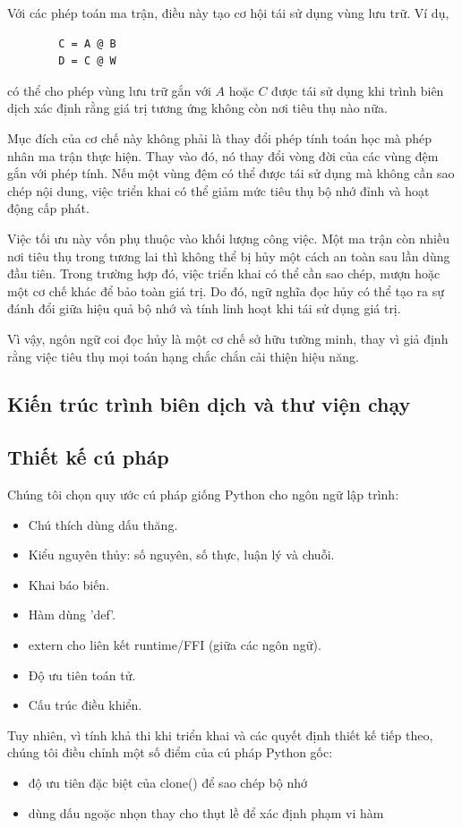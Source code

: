 \documentclass[a4paper]{article}
\begin{document}
	Với các phép toán ma trận, điều này tạo cơ hội tái sử dụng vùng lưu trữ. Ví dụ,
	
	\begin{lstlisting}
		C = A @ B
		D = C @ W
	\end{lstlisting}
	
	có thể cho phép vùng lưu trữ gắn với $A$ hoặc $C$ được tái sử dụng khi trình biên dịch xác định rằng giá trị tương ứng không còn nơi tiêu thụ nào nữa.
	
	Mục đích của cơ chế này không phải là thay đổi phép tính toán học mà phép nhân ma trận thực hiện. Thay vào đó, nó thay đổi vòng đời của các vùng đệm gắn với phép tính. Nếu một vùng đệm có thể được tái sử dụng mà không cần sao chép nội dung, việc triển khai có thể giảm mức tiêu thụ bộ nhớ đỉnh và hoạt động cấp phát.
	
	Việc tối ưu này vốn phụ thuộc vào khối lượng công việc. Một ma trận còn nhiều nơi tiêu thụ trong tương lai thì không thể bị hủy một cách an toàn sau lần dùng đầu tiên. Trong trường hợp đó, việc triển khai có thể cần sao chép, mượn hoặc một cơ chế khác để bảo toàn giá trị. Do đó, ngữ nghĩa đọc hủy có thể tạo ra sự đánh đổi giữa hiệu quả bộ nhớ và tính linh hoạt khi tái sử dụng giá trị.
	
	Vì vậy, ngôn ngữ coi đọc hủy là một cơ chế sở hữu tường minh, thay vì giả định rằng việc tiêu thụ mọi toán hạng chắc chắn cải thiện hiệu năng.
	
	\subsection{Kiến trúc trình biên dịch và thư viện chạy}
	
	\subsection{ Thiết kế cú pháp }
	
	Chúng tôi chọn quy ước cú pháp giống Python cho ngôn ngữ lập trình:
	\begin{itemize}
		\item Chú thích dùng dấu thăng.
		\item Kiểu nguyên thủy: số nguyên, số thực, luận lý và chuỗi.
		\item Khai báo biến.
		\item Hàm dùng 'def'.
		\item extern cho liên kết runtime/FFI (giữa các ngôn ngữ).
		\item Độ ưu tiên toán tử.
		\item Cấu trúc điều khiển.
	\end{itemize}
	Tuy nhiên, vì tính khả thi khi triển khai và các quyết định thiết kế tiếp theo, chúng tôi điều chỉnh một số điểm của cú pháp Python gốc:
	\begin{itemize}
		\item độ ưu tiên đặc biệt của clone() để sao chép bộ nhớ
		\item dùng dấu ngoặc nhọn thay cho thụt lề để xác định phạm vi hàm
	\end{itemize}
	
\end{document}
